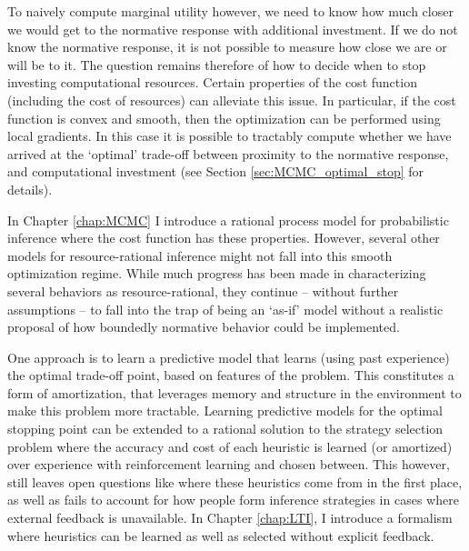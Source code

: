 To naively compute marginal utility however, we need to know how much closer we would get to the normative response with additional investment. If we do not know the normative response, it is not possible to measure how close we are or will be to it. The question remains therefore of how to decide when to stop investing computational resources. Certain properties of the cost function (including the cost of resources) can alleviate this issue. In particular, if the cost function is convex and smooth, then the optimization can be performed using local gradients. In this case it is possible to tractably compute whether we have arrived at the `optimal' trade-off between proximity to the normative response, and computational investment (see Section \ref{sec:MCMC_optimal_stop} for details).


In Chapter \ref{chap:MCMC} I introduce a rational process model for probabilistic inference where the cost function has these properties. However, several other models for resource-rational inference might not fall into this smooth optimization regime. \citep{horvitz1989reflection, russell1994provably, hay2014selecting} While much progress has been made in characterizing several behaviors as resource-rational, they continue -- without further assumptions -- to fall into the trap of being an `as-if' model without a realistic proposal of how boundedly normative behavior could be implemented. 

One approach is to learn a predictive model that learns (using past experience) the optimal trade-off point, based on features of the problem. This constitutes a form of amortization, that leverages memory and structure in the environment to make this problem more tractable. Learning predictive models for the optimal stopping point can be extended to a rational solution to the strategy selection problem\citep{lieder2017strategy} where the accuracy and cost of each heuristic is learned (or amortized) over experience with reinforcement learning and chosen between. \citep{erev05, rieskamp06} This however, still leaves open questions like where these heuristics come from in the first place, as well as fails to account for how people form inference strategies in cases where external feedback is unavailable. In Chapter \ref{chap:LTI}, I introduce a formalism where heuristics can be learned as well as selected without explicit feedback.

